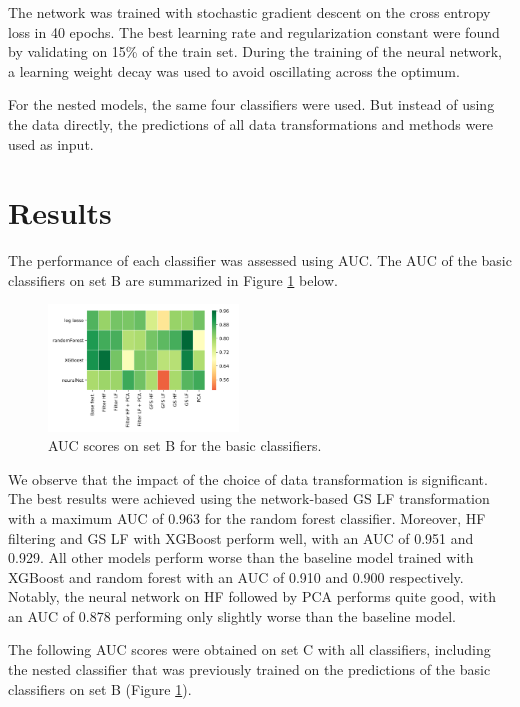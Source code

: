 \documentclass[10pt,conference,compsocconf]{IEEEtran}
\begin{document}
The network was trained with stochastic gradient descent on the cross entropy loss in 40 epochs. The best learning rate and regularization constant were found by validating on 15\% of the train set. During the training of the neural network, a learning weight decay was used to avoid oscillating across the optimum.
\par
For the nested models, the same four classifiers were used. But instead of using the data directly, the predictions of all data transformations and methods were used as input.

\section*{Results}
The performance of each classifier was assessed using AUC.
The AUC of the basic classifiers on set B are summarized in Figure \ref{fig:train_acc} below.
\begin{figure}[H]
	\centering
	\includegraphics[width=0.45\textwidth]{train_auc.png}
	\caption{AUC scores on set B for the basic classifiers.}
	\label{fig:train_acc}
\end{figure}
We observe that the impact of the choice of data transformation is significant.
The best results were achieved using the network-based GS LF transformation with a maximum AUC of 0.963 for the random forest classifier. Moreover, HF filtering and GS LF with XGBoost perform well, with an AUC of 0.951 and 0.929. All other models perform worse than the baseline model trained with XGBoost and random forest with an AUC of 0.910 and 0.900 respectively. Notably, the neural network on HF followed by PCA performs quite good, with an AUC of 0.878 performing only slightly worse than the baseline model.
\par  
The following AUC scores were obtained on set C with all classifiers, including the nested classifier that was previously trained on the predictions of the basic classifiers on set B (Figure \ref{fig:train_acc}).
\end{document}
